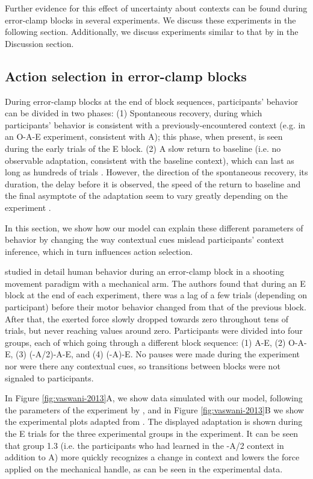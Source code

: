 \documentclass[a4paper,doc,floatsintext,natbib]{apa6}
\def \fref #1{Figure \ref{#1}}     %
\begin{document}
Further evidence for this effect of uncertainty about contexts can be found during error-clamp blocks in several experiments. We discuss these experiments in the following section. Additionally, we discuss experiments similar to that by \cite{Davidson_Scaling_2004} in the Discussion section.


\subsection{Action selection in error-clamp blocks}
During error-clamp blocks at the end of block sequences, participants' behavior can be divided in two phases: (1) Spontaneous recovery, during which participants' behavior is consistent with a previously-encountered context (e.g. in an O-A-E experiment, consistent with A); this phase, when present, is seen during the early trials of the E block. (2) A slow return to baseline (i.e. no observable adaptation, consistent with the baseline context), which can last as long as hundreds of trials \citep{Brennan_Decay_2015}. However, the direction of the spontaneous recovery, its duration, the delay before it is observed, the speed of the return to baseline and the final asymptote of the adaptation seem to vary greatly depending on the experiment \citep{Brennan_Decay_2015,Vaswani_Decay_2013,Smith_Interacting_2006,Shmuelof_Overcoming_2012}.

In this section, we show how our model can explain these different parameters of behavior by changing the way contextual cues mislead participants' context inference, which in turn influences action selection.

\cite{Vaswani_Decay_2013} studied in detail human behavior during an error-clamp block in a shooting movement paradigm with a mechanical arm. The authors found that during an E block at the end of each experiment, there was a lag of a few trials (depending on participant) before their motor behavior changed from that of the previous block. After that, the exerted force slowly dropped towards zero throughout tens of trials, but never reaching values around zero. Participants were divided into four groups, each of which going through a different block sequence: (1) A-E, (2) O-A-E, (3) (-A/2)-A-E, and (4) (-A)-E. No pauses were made during the experiment nor were there any contextual cues, so transitions between blocks were not signaled to participants.

In \fref{fig:vaswani-2013}A, we show data simulated with our model, following the parameters of the experiment by \cite{Vaswani_Decay_2013}, and in \fref{fig:vaswani-2013}B we show the experimental plots adapted from \cite{Vaswani_Decay_2013}. The displayed adaptation is shown during the E trials for the three experimental groups in the experiment. It can be seen that group 1.3 (i.e. the participants who had learned in the -A/2 context in addition to A) more quickly recognizes a change in context and lowers the force applied on the mechanical handle, as can be seen in the experimental data.
\end{document}

